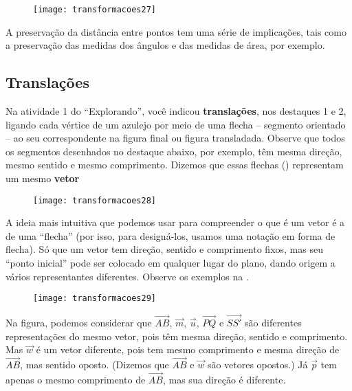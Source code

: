 \begin{figure}[H]
\centering

\texttt{[image: transformacoes27]}
\caption{}
\label{transformacoes27}
\end{figure}

A preservação da distância entre pontos tem uma série de implicações, tais como a preservação das medidas dos ângulos e das medidas de área, por exemplo. 

\subsection{Translações}

Na atividade 1 do “Explorando”, você indicou \textbf{translações}, nos destaques 1 e 2, ligando cada vértice de um azulejo por meio de uma flecha – segmento orientado – ao seu correspondente na figura final ou figura transladada. Observe que todos os segmentos desenhados no destaque abaixo, por exemplo, têm mesma direção, mesmo sentido e mesmo comprimento.  Dizemos que essas flechas () representam um mesmo \textbf{vetor}

\begin{figure}[H]
\centering

\texttt{[image: transformacoes28]}
\caption{}
\label{transformacoes28}
\end{figure}

A ideia mais intuitiva que podemos usar para compreender o que é um vetor é a de uma “flecha” (por isso, para designá-los, usamos uma notação em forma de flecha). Só que um vetor tem direção, sentido e comprimento fixos, mas seu “ponto inicial” pode ser colocado em qualquer lugar do plano, dando origem a vários representantes diferentes. Observe os exemplos na .

\begin{figure}[H]
\centering

\texttt{[image: transformacoes29]}
\caption{}
\label{transformacoes29}
\end{figure}

Na figura, podemos considerar que $\overrightarrow{AB}$, $\overrightarrow{m}$, $\overrightarrow{u}$, $\overrightarrow{PQ}$ e $\overrightarrow{SS'}$ são diferentes representações do mesmo vetor, pois têm mesma direção, sentido e comprimento. Mas $\overrightarrow{w}$ é um vetor diferente, pois tem mesmo comprimento e mesma direção de $\overrightarrow{AB}$, mas sentido oposto. (Dizemos que $\overrightarrow{AB}$ e $\overrightarrow{w}$ são vetores opostos.) Já $\overrightarrow{p}$ tem apenas o mesmo comprimento de $\overrightarrow{AB}$, mas sua direção é diferente. 

